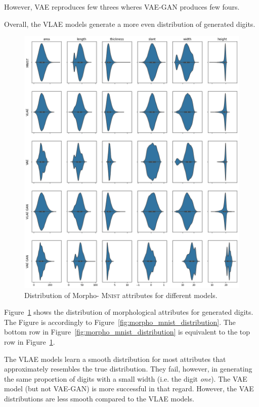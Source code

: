 However, \ac{VAE} reproduces few threes wheres \ac{VAE}-\ac{GAN} produces few fours.

Overall, the \ac{VLAE} models generate a more even distribution of generated digits.

\begin{figure}
    \centering
    \includegraphics[width=\textwidth]{images/generated_vs_true/morpho_distr.png}
    \caption{Distribution of Morpho- \textsc{Mnist} attributes for different models.}
    \label{fig:generated_morpho_distribution}
\end{figure}

Figure~\ref{fig:generated_morpho_distribution} shows the distribution of morphological attributes for generated digits.
The Figure is accordingly to Figure~\ref{fig:morpho_mnist_distribution}.
The bottom row in Figure~\ref{fig:morpho_mnist_distribution} is equivalent to the top row in Figure~\ref{fig:generated_morpho_distribution}.

The \ac{VLAE} models learn a smooth distribution for most attributes that approximately resembles the true distribution.
They fail, however, in generating the same proportion of digits with a small width (i.e. the digit \textit{one}).
The \ac{VAE} model (but not \ac{VAE}-\ac{GAN}) is more successful in that regard.
However, the \ac{VAE} distributions are less smooth compared to the \ac{VLAE} models.

